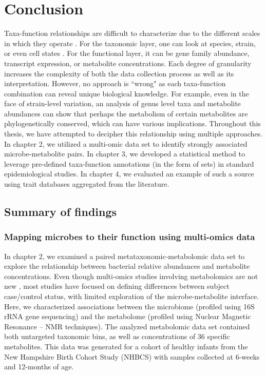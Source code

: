 \chapter{Conclusion}

Taxa-function relationships are difficult to characterize due to the different scales in which they operate \cite{langille2018exploring}. For the taxonomic layer, one can look at species, strain, or even cell states \cite{mcnulty2021dropletbased}. For the functional layer, it can be gene family abundance, transcript expression, or metabolite concentrations. Each degree of granularity increases the complexity of both the data collection process as well as its interpretation. However, no approach is ``wrong" as each taxa-function combination can reveal unique biological knowledge. For example, even in the face of strain-level variation, an analysis of genus level taxa and metabolite abundances can show that perhaps the metabolism of certain metabolites are phylogenetically conserved, which can have various implications. Throughout this thesis, we have attempted to decipher this relationship using multiple approaches. In chapter 2, we utilized a multi-omic data set to identify strongly associated microbe-metabolite pairs. In chapter 3, we developed a statistical method to leverage pre-defined taxa-function annotations (in the form of sets) in standard epidemiological studies. In chapter 4, we evaluated an example of such a source using trait databases aggregated from the literature.  

\section{Summary of findings}
\subsection{Mapping microbes to their function using multi-omics data}

In chapter 2, we examined a paired metataxonomic-metabolomic data set to explore the relationship between bacterial relative abundances and metabolite concentrations. Even though multi-omics studies involving metabolomics are not new \cite{lloyd-price2019multiomics, ayeni2018infant, kisuse2018urban}, most studies have focused on defining differences between subject case/control status, with limited exploration of the microbe-metabolite interface. Here, we characterized associations between the microbiome (profiled using 16S rRNA gene sequencing) and the metabolome (profiled using Nuclear Magnetic Resonance -- NMR techniques). The analyzed metabolomic data set contained both untargeted taxonomic bins, as well as  concentrations of 36 specific metabolites. This data was generated for a cohort of healthy infants from the New Hampshire Birth Cohort Study (NHBCS) \cite{gilbert-diamond2011rice} with samples collected at 6-weeks and 12-months of age. 

